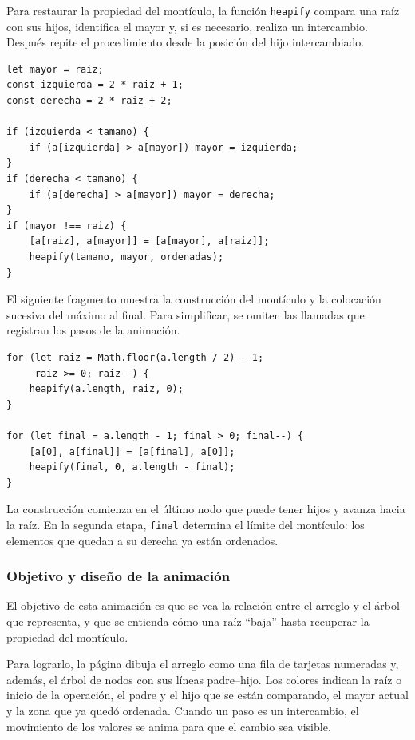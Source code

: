 \documentclass[12pt,a4paper]{article}
\begin{document}
Para restaurar la propiedad del montículo, la función \texttt{heapify} compara una raíz con sus hijos, identifica el mayor y, si es necesario, realiza un intercambio. Después repite el procedimiento desde la posición del hijo intercambiado.

\begin{lstlisting}[caption={Restauración del montículo en Heap Sort}]
let mayor = raiz;
const izquierda = 2 * raiz + 1;
const derecha = 2 * raiz + 2;

if (izquierda < tamano) {
    if (a[izquierda] > a[mayor]) mayor = izquierda;
}
if (derecha < tamano) {
    if (a[derecha] > a[mayor]) mayor = derecha;
}
if (mayor !== raiz) {
    [a[raiz], a[mayor]] = [a[mayor], a[raiz]];
    heapify(tamano, mayor, ordenadas);
}
\end{lstlisting}

El siguiente fragmento muestra la construcción del montículo y la colocación sucesiva del máximo al final. Para simplificar, se omiten las llamadas que registran los pasos de la animación.

\begin{lstlisting}[caption={Construcción y extracción en Heap Sort}]
for (let raiz = Math.floor(a.length / 2) - 1;
     raiz >= 0; raiz--) {
    heapify(a.length, raiz, 0);
}

for (let final = a.length - 1; final > 0; final--) {
    [a[0], a[final]] = [a[final], a[0]];
    heapify(final, 0, a.length - final);
}
\end{lstlisting}

La construcción comienza en el último nodo que puede tener hijos y avanza hacia la raíz. En la segunda etapa, \texttt{final} determina el límite del montículo: los elementos que quedan a su derecha ya están ordenados.

\subsubsection{Objetivo y diseño de la animación}

El objetivo de esta animación es que se vea la relación entre el arreglo y el árbol que representa, y que se entienda cómo una raíz ``baja'' hasta recuperar la propiedad del montículo.

Para lograrlo, la página dibuja el arreglo como una fila de tarjetas numeradas y, además, el árbol de nodos con sus líneas padre--hijo. Los colores indican la raíz o inicio de la operación, el padre y el hijo que se están comparando, el mayor actual y la zona que ya quedó ordenada. Cuando un paso es un intercambio, el movimiento de los valores se anima para que el cambio sea visible.
\end{document}
